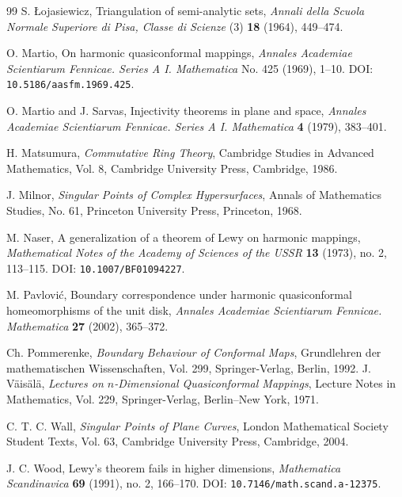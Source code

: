 \documentclass[11pt]{amsart}
\theoremstyle{definition}
\theoremstyle{remark}
\begin{document}
\begin{thebibliography}{99}
S. \L{}ojasiewicz,
\newblock Triangulation of semi-analytic sets,
\newblock \emph{Annali della Scuola Normale Superiore di Pisa, Classe di Scienze} (3) \textbf{18} (1964), 449--474.


O. Martio,
\newblock On harmonic quasiconformal mappings,
\newblock \emph{Annales Academiae Scientiarum Fennicae. Series A I. Mathematica}
No. 425 (1969), 1--10.
\newblock DOI: \texttt{10.5186/aasfm.1969.425}.

O. Martio and J. Sarvas,
\newblock Injectivity theorems in plane and space,
\newblock \emph{Annales Academiae Scientiarum Fennicae. Series A I.
Mathematica} \textbf{4} (1979), 383--401.

H. Matsumura,
\newblock \emph{Commutative Ring Theory},
\newblock Cambridge Studies in Advanced Mathematics, Vol. 8,
\newblock Cambridge University Press, Cambridge, 1986.

J. Milnor,
\newblock \emph{Singular Points of Complex Hypersurfaces},
\newblock Annals of Mathematics Studies, No. 61,
\newblock Princeton University Press, Princeton, 1968.

M. Naser,
\newblock A generalization of a theorem of Lewy on harmonic mappings,
\newblock \emph{Mathematical Notes of the Academy of Sciences of the USSR} \textbf{13} (1973), no. 2, 113--115.
\newblock DOI: \texttt{10.1007/BF01094227}.

M. Pavlovi\'c,
\newblock Boundary correspondence under harmonic quasiconformal homeomorphisms
of the unit disk,
\newblock \emph{Annales Academiae Scientiarum Fennicae. Mathematica}
\textbf{27} (2002), 365--372.

Ch. Pommerenke,
\newblock \emph{Boundary Behaviour of Conformal Maps},
\newblock Grundlehren der mathematischen Wissenschaften, Vol. 299,
\newblock Springer-Verlag, Berlin, 1992.
J. V\"ais\"al\"a,
\newblock \emph{Lectures on \(n\)-Dimensional Quasiconformal Mappings},
\newblock Lecture Notes in Mathematics, Vol. 229,
\newblock Springer-Verlag, Berlin--New York, 1971.

C. T. C. Wall,
\newblock \emph{Singular Points of Plane Curves},
\newblock London Mathematical Society Student Texts, Vol. 63,
\newblock Cambridge University Press, Cambridge, 2004.

J. C. Wood,
\newblock Lewy's theorem fails in higher dimensions,
\newblock \emph{Mathematica Scandinavica} \textbf{69} (1991), no. 2, 166--170.
\newblock DOI: \texttt{10.7146/math.scand.a-12375}.

\end{thebibliography}
\end{document}
